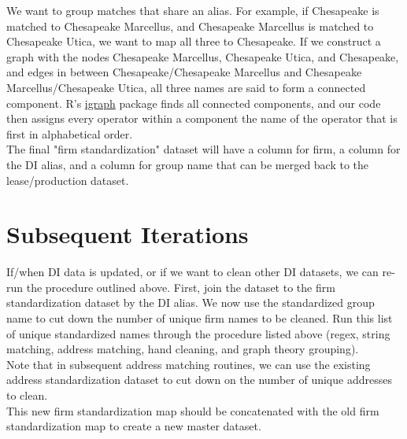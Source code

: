 \documentclass{article}
\begin{document}
We want to group matches that share an alias. For example, if Chesapeake is matched to Chesapeake Marcellus, and Chesapeake Marcellus is matched to Chesapeake Utica, we want to map all three to Chesapeake. If we construct a graph with the nodes Chesapeake Marcellus, Chesapeake Utica, and Chesapeake, and edges in between Chesapeake/Chesapeake Marcellus and Chesapeake Marcellus/Chesapeake Utica, all three names are said to form a connected component. R's \href{https://igraph.org/r/}{igraph} package finds all connected components, and our code then assigns every operator within a component the name of the operator that is first in alphabetical order. \\

The final "firm standardization" dataset will have a column for firm, a column for the DI alias, and a column for group name that can be merged back to the lease/production dataset. 

\section{Subsequent Iterations}
If/when DI data is updated, or if we want to clean other DI datasets, we can re-run the procedure outlined above. First, join the dataset to the firm standardization dataset by the DI alias. We now use the standardized group name to cut down the number of unique firm names to be cleaned. Run this list of unique standardized names through the procedure listed above (regex, string matching, address matching, hand cleaning, and graph theory grouping). \\

Note that in subsequent address matching routines, we can use the existing address standardization dataset to cut down on the number of unique addresses to clean. \\

This new firm standardization map should be concatenated with the old firm standardization map to create a new master dataset. 
\end{document}
